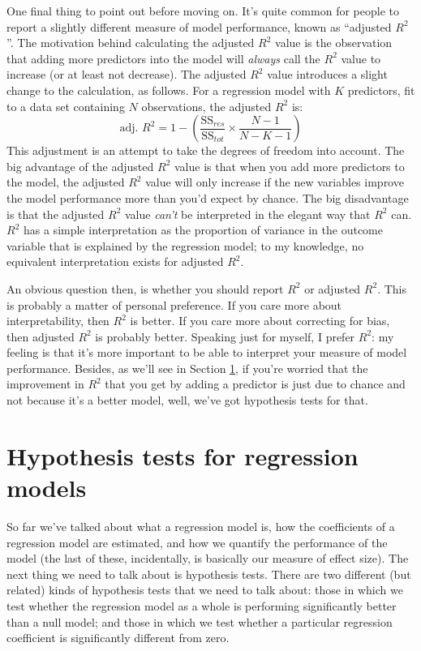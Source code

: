 \documentclass[
]{book}
\begin{document}
One final thing to point out before moving on. It's quite common for people to report a slightly different measure of model performance, known as ``adjusted \(R^2\)''. The motivation behind calculating the adjusted \(R^2\) value is the observation that adding more predictors into the model will \emph{always} call the \(R^2\) value to increase (or at least not decrease). The adjusted \(R^2\) value introduces a slight change to the calculation, as follows. For a regression model with \(K\) predictors, fit to a data set containing \(N\) observations, the adjusted \(R^2\) is:
\[
\mbox{adj. } R^2 = 1 - \left(\frac{\mbox{SS}_{res}}{\mbox{SS}_{tot}} \times \frac{N-1}{N-K-1} \right)
\]
This adjustment is an attempt to take the degrees of freedom into account. The big advantage of the adjusted \(R^2\) value is that when you add more predictors to the model, the adjusted \(R^2\) value will only increase if the new variables improve the model performance more than you'd expect by chance. The big disadvantage is that the adjusted \(R^2\) value \emph{can't} be interpreted in the elegant way that \(R^2\) can. \(R^2\) has a simple interpretation as the proportion of variance in the outcome variable that is explained by the regression model; to my knowledge, no equivalent interpretation exists for adjusted \(R^2\).

An obvious question then, is whether you should report \(R^2\) or adjusted \(R^2\). This is probably a matter of personal preference. If you care more about interpretability, then \(R^2\) is better. If you care more about correcting for bias, then adjusted \(R^2\) is probably better. Speaking just for myself, I prefer \(R^2\): my feeling is that it's more important to be able to interpret your measure of model performance. Besides, as we'll see in Section \ref{regressiontests}, if you're worried that the improvement in \(R^2\) that you get by adding a predictor is just due to chance and not because it's a better model, well, we've got hypothesis tests for that.

\hypertarget{regressiontests}{%
\section{Hypothesis tests for regression models}\label{regressiontests}}

So far we've talked about what a regression model is, how the coefficients of a regression model are estimated, and how we quantify the performance of the model (the last of these, incidentally, is basically our measure of effect size). The next thing we need to talk about is hypothesis tests. There are two different (but related) kinds of hypothesis tests that we need to talk about: those in which we test whether the regression model as a whole is performing significantly better than a null model; and those in which we test whether a particular regression coefficient is significantly different from zero.
\end{document}
